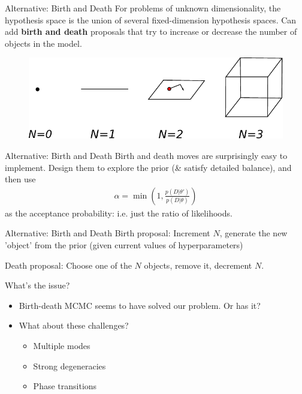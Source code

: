 \begin{frame}[t]{Alternative: Birth and Death}
For problems of unknown dimensionality, the hypothesis space is the union
of several fixed-dimension hypothesis spaces. Can add {\bf birth and death}
proposals that try to increase or decrease the number of objects in the model.

\begin{figure}
\begin{center}
\includegraphics[scale=0.7]{drawing.pdf}
\end{center}
\end{figure}
\end{frame}


\begin{frame}[t]{Alternative: Birth and Death}
Birth and death moves are surprisingly easy to implement. Design them to
explore the prior (\& satisfy detailed balance), and then use
\begin{eqnarray}
\alpha = \min\left(1, \frac{p(D|\theta')}{p(D|\theta)}\right)
\end{eqnarray}
as the acceptance probability: i.e. just the ratio of likelihoods.
\end{frame}

\begin{frame}[t]{Alternative: Birth and Death}
Birth proposal: Increment $N$, generate the new 'object' from the prior
(given current values of hyperparameters)

\vspace{20pt}

Death proposal: Choose one of the $N$ objects, remove it, decrement $N$.
\end{frame}


\begin{frame}[t]{What's the issue?}
\begin{itemize}
\setlength{\itemsep}{20pt}
\item Birth-death MCMC seems to have solved our problem. Or has it?
\item What about these challenges?
\vspace{20pt}
  \begin{itemize}
  \setlength{\itemsep}{20pt}
  \item Multiple modes
  \item Strong degeneracies
  \item Phase transitions
  \end{itemize}
\end{itemize}
\end{frame}

